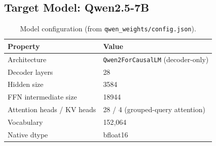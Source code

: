 \documentclass[11pt,a4paper]{article}
\begin{document}
\subsection{Target Model: Qwen2.5-7B}
\begin{table}[h]
\centering
\begin{tabular}{@{}ll@{}}
\toprule
Property & Value \\
\midrule
Architecture & \texttt{Qwen2ForCausalLM} (decoder-only) \\
Decoder layers & 28 \\
Hidden size & 3584 \\
FFN intermediate size & 18944 \\
Attention heads / KV heads & 28 / 4 (grouped-query attention) \\
Vocabulary & 152{,}064 \\
Native dtype & bfloat16 \\
\bottomrule
\end{tabular}
\caption{Model configuration (from \texttt{qwen\_weights/config.json}).}
\end{table}

\end{document}

